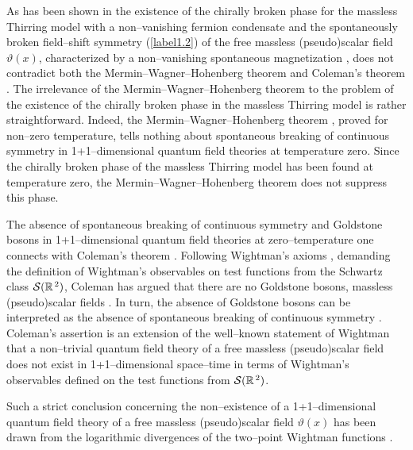 \documentclass[a4paper,12pt] {article}
\begin{document}
As has been shown in\cite{th0112184,th0204237,th0206244} the existence
of the chirally broken phase for the massless Thirring model with a
non--vanishing fermion condensate \cite{th0105057} and the
spontaneously broken field--shift symmetry (\ref{label1.2}) of the
free massless (pseudo)scalar field $\vartheta(x)$, characterized by a
non--vanishing spontaneous magnetization
\cite{th0112184,th0204237,th0206244}, does not contradict both the
Mermin--Wagner--Hohenberg theorem \cite{MWH66} and Coleman's theorem
\cite{Co73}.  The irrelevance of the Mermin--Wagner--Hohenberg theorem
\cite{MWH66} to the problem of the existence of the chirally broken
phase in the massless Thirring model is rather straightforward.
Indeed, the Mermin--Wagner--Hohenberg theorem \cite{MWH66}, proved for
non--zero temperature, tells nothing about spontaneous breaking of
continuous symmetry in 1+1--dimensional quantum field theories at
temperature zero\cite{th0112184,th0204237,th0206244}. Since the
chirally broken phase of the massless Thirring model \cite{th0105057}
has been found at temperature zero, the Mermin--Wagner--Hohenberg
theorem \cite{MWH66} does not suppress this phase.

The absence of spontaneous breaking of continuous symmetry and
Goldstone bosons in 1+1--dimensional quantum field theories at
zero--temperature one connects with Coleman's theorem \cite{Co73}.
Following Wightman's axioms \cite{Wi64}, demanding the definition of
Wightman's observables on test functions from the Schwartz class
${\cal S}(\mathbb{R}^{\,2})$, Coleman has argued that there are no
Goldstone bosons, massless (pseudo)scalar fields \cite{Co73}. In turn,
the absence of Goldstone bosons \cite{Go61} can be interpreted as the
absence of spontaneous breaking of continuous symmetry \cite{Co75}.
Coleman's assertion is an extension of the well--known statement of
Wightman \cite{Wi64} that a non--trivial quantum field theory of a
free massless (pseudo)scalar field does not exist in 1+1--dimensional
space--time in terms of Wightman's observables defined on the test
functions from ${\cal S}(\mathbb{R}^{\,2})$.

Such a strict conclusion concerning the non--existence of a
1+1--dimensional quantum field theory of a free massless
(pseudo)scalar field $\vartheta(x)$ has been drawn from the
logarithmic divergences of the two--point Wightman functions
\cite{Wi64}.
\end{document}
